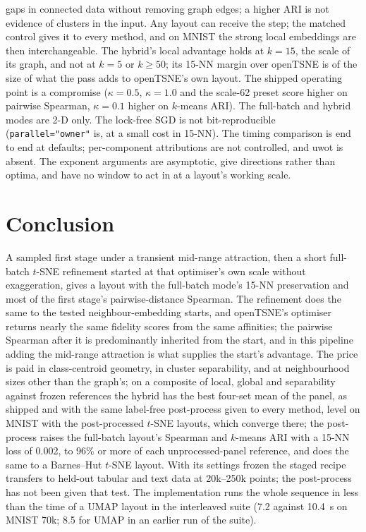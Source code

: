 \documentclass[11pt]{article}
\begin{document}
gaps in connected data without removing graph edges; a higher ARI is not evidence of clusters in the
input. Any layout can receive the step; the matched control gives it to every method, and on MNIST the strong local
embeddings are then interchangeable. The hybrid's
local advantage holds at $k = 15$, the scale of its graph, and not at $k = 5$ or $k \ge 50$; its 15-NN
margin over openTSNE is of the size of what the pass adds to openTSNE's own layout. The shipped operating point is a
compromise ($\kappa = 0.5$, $\kappa = 1.0$ and the scale-62 preset score higher on pairwise Spearman, $\kappa = 0.1$ higher on $k$-means ARI). The
full-batch and hybrid modes are 2-D only. The lock-free SGD is not bit-reproducible
(\texttt{parallel="owner"} is, at a small cost in 15-NN). The timing comparison is end to end at
defaults; per-component attributions are not controlled, and uwot is absent. The exponent arguments are
asymptotic, give directions rather than optima, and have no window to act in at a layout's working
scale.

\section{Conclusion}
A sampled first stage under a transient mid-range attraction, then a short full-batch $t$-SNE
refinement started at that optimiser's own scale without exaggeration, gives a layout with the
full-batch mode's 15-NN preservation and most of the first stage's pairwise-distance Spearman. The
refinement does the same to the tested neighbour-embedding starts, and openTSNE's optimiser returns
nearly the same fidelity scores from the same affinities; the pairwise Spearman after it is predominantly inherited from the start, and in
this pipeline adding the mid-range attraction is what supplies the start's advantage. The price is paid
in class-centroid geometry, in cluster separability, and at neighbourhood sizes other than the graph's;
on a composite of local, global and separability against frozen references the hybrid has the best four-set
mean of the panel, as shipped and with the same label-free post-process given to every method, level on MNIST
with the post-processed $t$-SNE layouts, which converge there; the post-process raises the full-batch layout's Spearman and
$k$-means ARI with a 15-NN loss of 0.002, to 96\% or more of each unprocessed-panel reference, and does the same
to a Barnes--Hut $t$-SNE layout. With its settings frozen
the staged recipe transfers to held-out tabular and text data at 20k--250k points; the post-process has
not been given that test. The implementation runs
the whole sequence in less than the time of a UMAP layout in the interleaved suite (7.2 against 10.4~s on MNIST 70k; 8.5 for UMAP in an earlier run of the suite).
\end{document}
